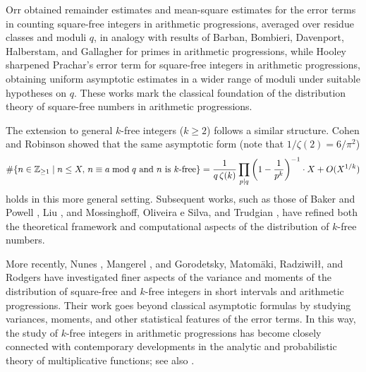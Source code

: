 \documentclass[11pt, reqno]{amsart}
\numberwithin{equation}{section}
\newcommand{\suchthat}{\;\ifnum\currentgrouptype=16 \middle\fi|\;}
\newcommand{\Z}{\mathbb{Z}}
\theoremstyle{definition}
\begin{document}
Orr \cite{Orr71} obtained remainder estimates and mean-square estimates for the error terms in counting square-free integers in arithmetic progressions, averaged over residue classes and moduli $q$, in analogy with results of Barban, Bombieri, Davenport, Halberstam, and Gallagher for primes in arithmetic progressions, while Hooley \cite{Hoo75} sharpened Prachar’s error term for square-free integers in arithmetic progressions, obtaining uniform asymptotic estimates in a wider range of moduli under suitable hypotheses on $q$.  These works mark the classical foundation of the distribution theory of square-free numbers in arithmetic progressions.

The extension to general $k$-free integers ($k \ge 2$) follows a similar structure. Cohen and Robinson \cite{cohen1963distribution} showed that the same asymptotic form (note that $1/\zeta(2) = 6/\pi^2$)
\begin{equation}
\label{eqn:cohen}
\#\{ n \in \Z_{\ge 1} \suchthat \text{$n \le X, \, n \equiv a \bmod q$ and $n$ is $k$-free} \}
= \frac{1}{q\,\zeta(k)}
  \prod_{p\mid q}\left(1 - \frac{1}{p^k}\right)^{-1}
  \cdot X
  + O(X^{1/k})
\end{equation}
holds in this more general setting.
Subsequent works, such as those of Baker and Powell \cite{BP10}, Liu \cite{Liu14,Liu16}, and Mossinghoff, Oliveira e Silva, and Trudgian \cite{MOT21}, have refined both the theoretical framework and computational aspects of the distribution of $k$-free numbers.  

More recently, Nunes \cite{Nun15,Nun22}, Mangerel \cite{Man21}, and Gorodetsky, Matomäki, Radziwiłł, and Rodgers \cite{GMRR21} have investigated finer aspects of the variance and moments of the distribution of square-free and $k$-free integers in short intervals and arithmetic progressions. Their work goes beyond classical asymptotic formulas by studying variances, moments, and other statistical features of the error terms. In this way, the study of $k$-free integers in arithmetic progressions has become closely connected with contemporary developments in the analytic and probabilistic theory of multiplicative functions; see also \cite{montgomery-vaughan2007}.

\medskip
\end{document}

